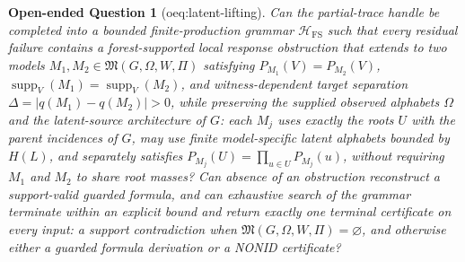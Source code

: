 \documentclass{article}
\newtheorem{openendedquestion}{Open-ended Question}
\begin{document}
\begin{openendedquestion}[oeq:latent-lifting]\label{oeq:latent-lifting}
Can the partial-trace handle be completed into a bounded finite-production grammar \(\mathcal H_{\mathrm{FS}}\) such that every residual failure contains a forest-supported local response obstruction that extends to two models \(M_1,M_2\in\mathfrak M(G,\Omega,W,\Pi)\) satisfying \(P_{M_1}(V)=P_{M_2}(V)\), \(\operatorname{supp}_V(M_1)=\operatorname{supp}_V(M_2)\), and witness-dependent target separation \(\Delta=|q(M_1)-q(M_2)|>0\), while preserving the supplied observed alphabets \(\Omega\) and the latent-source architecture of \(G\): each \(M_j\) uses exactly the roots \(U\) with the parent incidences of \(G\), may use finite model-specific latent alphabets bounded by \(H(L)\), and separately satisfies \(P_{M_j}(U)=\prod_{u\in U}P_{M_j}(u)\), without requiring \(M_1\) and \(M_2\) to share root masses? Can absence of an obstruction reconstruct a support-valid guarded formula, and can exhaustive search of the grammar terminate within an explicit bound and return exactly one terminal certificate on every input: a support contradiction when \(\mathfrak M(G,\Omega,W,\Pi)=\varnothing\), and otherwise either a guarded formula derivation or a NONID certificate?


\end{openendedquestion}
\end{document}
